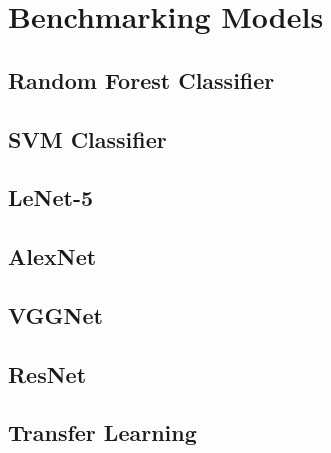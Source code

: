 \chapter{Benchmarking Models}

\section{Random Forest Classifier}

\section{SVM Classifier}

\section{LeNet-5}

\section{AlexNet}

\section{VGGNet}

\section{ResNet}

\section{Transfer Learning}